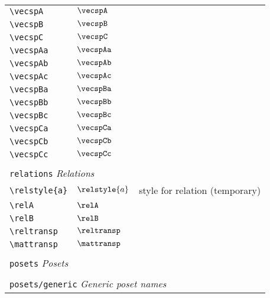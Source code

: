 \begin{longtable}{lll}
 {\color[rgb]{0.5,0.5,0.5}\texttt{\textbackslash vecspA}} & $\vecspA$ & \\ 
 {\color[rgb]{0.5,0.5,0.5}\texttt{\textbackslash vecspB}} & $\vecspB$ & \\ 
 {\color[rgb]{0.5,0.5,0.5}\texttt{\textbackslash vecspC}} & $\vecspC$ & \\ 
 {\color[rgb]{0.5,0.5,0.5}\texttt{\textbackslash vecspAa}} & $\vecspAa$ & \\ 
 {\color[rgb]{0.5,0.5,0.5}\texttt{\textbackslash vecspAb}} & $\vecspAb$ & \\ 
 {\color[rgb]{0.5,0.5,0.5}\texttt{\textbackslash vecspAc}} & $\vecspAc$ & \\ 
 {\color[rgb]{0.5,0.5,0.5}\texttt{\textbackslash vecspBa}} & $\vecspBa$ & \\ 
 {\color[rgb]{0.5,0.5,0.5}\texttt{\textbackslash vecspBb}} & $\vecspBb$ & \\ 
 {\color[rgb]{0.5,0.5,0.5}\texttt{\textbackslash vecspBc}} & $\vecspBc$ & \\ 
 {\color[rgb]{0.5,0.5,0.5}\texttt{\textbackslash vecspCa}} & $\vecspCa$ & \\ 
 {\color[rgb]{0.5,0.5,0.5}\texttt{\textbackslash vecspCb}} & $\vecspCb$ & \\ 
 {\color[rgb]{0.5,0.5,0.5}\texttt{\textbackslash vecspCc}} & $\vecspCc$ & \\ 
  &  & \\ 
 \multicolumn{3}{l}{{\color[rgb]{0.5,0.5,0.5}\texttt{relations}} \emph{Relations}}\\ 
 \hline
\hline
{\color[rgb]{0.5,0.5,0.5}\texttt{\textbackslash relstyle\{a\}}} & $\relstyle{a}$ &  style for relation (temporary)\\ 
 {\color[rgb]{0.5,0.5,0.5}\texttt{\textbackslash relA}} & $\relA$ & \\ 
 {\color[rgb]{0.5,0.5,0.5}\texttt{\textbackslash relB}} & $\relB$ & \\ 
 {\color[rgb]{0.5,0.5,0.5}\texttt{\textbackslash reltransp}} & $\reltransp$ & \\ 
 {\color[rgb]{0.5,0.5,0.5}\texttt{\textbackslash mattransp}} & $\mattransp$ & \\ 
  &  & \\ 
 \multicolumn{3}{l}{{\color[rgb]{0.5,0.5,0.5}\texttt{posets}} \emph{Posets}}\\ 
 \hline
\hline
 &  & \\ 
 \multicolumn{3}{l}{{\color[rgb]{0.5,0.5,0.5}\texttt{posets/generic}} \emph{Generic poset names}}\\ 

\end{longtable}
